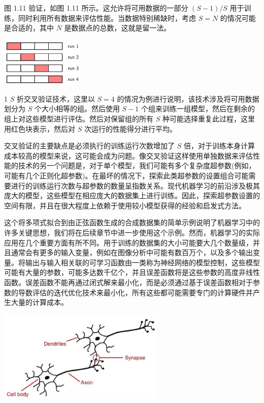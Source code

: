 \documentclass[10pt]{article}
\begin{document}
图 1.11 验证，如图 1.11 所示。这允许将可用数据的一部分 \(\left( {S - 1}\right) /S\) 用于训练，同时利用所有数据来评估性能。当数据特别稀缺时，考虑 \(S = N\) 的情况可能是合适的，其中 \(N\) 是数据点的总数，这就是留一法。

\begin{center}
\includegraphics[max width=0.3\textwidth]{images/0194e279-9b28-703a-88f4-c3ac21e2010d_34_1083_343_475_275_0.jpg}
\end{center}
\hspace*{3em} 

1 \(S\) 折交叉验证技术，这里以 \(S = 4\) 的情况为例进行说明，该技术涉及将可用数据划分为 \(S\) 个大小相等的组。然后使用 \(S - 1\) 个组来训练一组模型，然后在剩余的组上对这些模型进行评估。然后对保留组的所有 \(S\) 种可能选择重复此过程，这里用红色块表示，然后对 \(S\) 次运行的性能得分进行平均。

交叉验证的主要缺点是必须执行的训练运行次数增加了 \(S\) 倍，对于训练本身计算成本较高的模型来说，这可能会成为问题。像交叉验证这样使用单独数据来评估性能的技术的另一个问题是，对于单个模型，我们可能有多个复杂度超参数(例如，可能有几个正则化超参数)。在最坏的情况下，探索此类超参数的设置组合可能需要进行的训练运行次数与超参数的数量呈指数关系。现代机器学习的前沿涉及极其庞大的模型，这些模型在相应庞大的数据集上进行训练。因此，探索超参数设置的空间有限，并且在很大程度上依赖于使用较小模型获得的经验和启发式方法。

这个将多项式拟合到由正弦函数生成的合成数据集的简单示例说明了机器学习中的许多关键思想，我们将在后续章节中进一步使用这个示例。然而，机器学习的实际应用在几个重要方面有所不同。用于训练的数据集的大小可能要大几个数量级，并且通常会有更多的输入变量，例如在图像分析中可能有数百万个，以及多个输出变量。将输出与输入相关联的可学习函数由一类称为神经网络的模型控制，这些模型可能有大量的参数，可能多达数千亿个，并且误差函数将是这些参数的高度非线性函数。误差函数不能再通过闭式解来最小化，而是必须通过基于误差函数相对于参数的导数评估的迭代优化技术来最小化，所有这些都可能需要专门的计算硬件并产生大量的计算成本。

\begin{center}
\includegraphics[max width=0.6\textwidth]{images/0194e279-9b28-703a-88f4-c3ac21e2010d_35_755_356_776_426_0.jpg}
\end{center}
\hspace*{3em} 
\end{document}
